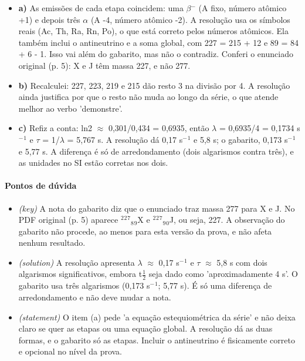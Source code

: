 \documentclass{article}%
\begin{document}
\begin{itemize}%
\item%
\textbf{a)} As emissões de cada etapa coincidem: uma $\beta$$^{-}$ (A fixo, número atômico +1) e depois três $\alpha$ (A -4, número atômico -2). A resolução usa os símbolos reais (Ac, Th, Ra, Rn, Po), o que está correto pelos números atômicos. Ela também inclui o antineutrino e a soma global, com 227 = 215 + 12 e 89 = 84 + 6 - 1. Isso vai além do gabarito, mas não o contradiz. Conferi o enunciado original (p. 5): X e J têm massa 227, e não 277.%
\item%
\textbf{b)} Recalculei: 227, 223, 219 e 215 dão resto 3 na divisão por 4. A resolução ainda justifica por que o resto não muda ao longo da série, o que atende melhor ao verbo 'demonstre'.%
\item%
\textbf{c)} Refiz a conta: ln2 $\approx$ 0,301/0,434 = 0,6935, então $\lambda$ = 0,6935/4 = 0,1734 s$^{-}$$^{1}$ e $\tau$ = 1/$\lambda$ = 5,767 s. A resolução dá 0,17 s$^{-}$$^{1}$ e 5,8 s; o gabarito, 0,173 s$^{-}$$^{1}$ e 5,77 s. A diferença é só de arredondamento (dois algarismos contra três), e as unidades no SI estão corretas nos dois.%
\end{itemize}%
\paragraph{Pontos de dúvida}%
\begin{itemize}%
\item%
\textit{(key)} A nota do gabarito diz que o enunciado traz massa 277 para X e J. No PDF original (p. 5) aparece $^2$$^2$$^{7}$$_{8}$$_{9}$X e $^2$$^2$$^{7}$$_{9}$$_{0}$J, ou seja, 227. A observação do gabarito não procede, ao menos para esta versão da prova, e não afeta nenhum resultado.%
\item%
\textit{(solution)} A resolução apresenta $\lambda$ $\approx$ 0,17 s$^{-}$$^{1}$ e $\tau$ $\approx$ 5,8 s com dois algarismos significativos, embora t$\frac12$ seja dado como 'aproximadamente 4 s'. O gabarito usa três algarismos (0,173 s$^{-}$$^{1}$; 5,77 s). É só uma diferença de arredondamento e não deve mudar a nota.%
\item%
\textit{(statement)} O item (a) pede 'a equação estequiométrica da série' e não deixa claro se quer as etapas ou uma equação global. A resolução dá as duas formas, e o gabarito só as etapas. Incluir o antineutrino é fisicamente correto e opcional no nível da prova.%
\end{itemize}%
\end{document}
